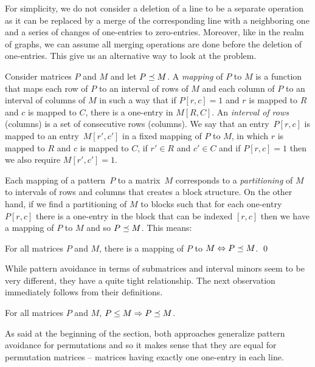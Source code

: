 For simplicity, we do not consider a deletion of a line to be a separate operation as it can be replaced by a merge of the corresponding line with a neighboring one and a series of changes of one-entries to zero-entries. Moreover, like in the realm of graphs, we can assume all merging operations are done before the deletion of one-entries. This give us an alternative way to look at the problem.

\begin{defn}
Consider matrices $P$ and $M$ and let $P\preceq M$. A \emph{mapping} of $P$ to $M$ is a function that maps each row of $P$ to an interval of rows of $M$ and each column of $P$ to an interval of columns of $M$ in such a way that if $P[r,c]=1$ and $r$ is mapped to $R$ and $c$ is mapped to $C$, there is a one-entry in $M[R,C]$. An \emph{interval of rows} (columns) is a set of consecutive rows (columns). We say that an entry~$P[r,c]$ is mapped to an entry~$M[r',c']$ in a fixed mapping of $P$ to $M$, in which $r$ is mapped to $R$ and $c$ is mapped to $C$, if $r'\in R$ and $c'\in C$ and if $P[r,c]=1$ then we also require $M[r',c']=1$.
\end{defn}

Each mapping of a pattern~$P$ to a matrix~$M$ corresponds to a \emph{partitioning} of $M$ to intervals of rows and columns that creates a block structure. On the other hand, if we find a partitioning of $M$ to blocks such that for each one-entry $P[r,c]$ there is a one-entry in the block that can be indexed $[r,c]$ then we have a mapping of $P$ to $M$ and so $P\preceq M$. This means:

\begin{obs}
For all matrices $P$ and $M$, there is a mapping of $P$ to $M\Leftrightarrow P\preceq M$. \qed
\end{obs}

While pattern avoidance in terms of submatrices and interval minors seem to be very different, they have a quite tight relationship. The next observation immediately follows from their definitions.

\begin{obs}
\label{obs:submin}
For all matrices $P$ and $M$, $P\leq M\Rightarrow P\preceq M$.
\end{obs}

As said at the beginning of the section, both approaches generalize pattern avoidance for permutations and so it makes sense that they are equal for permutation matrices -- matrices having exactly one one-entry in each line.

